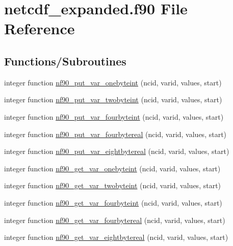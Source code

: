 \hypertarget{netcdf__expanded_8f90}{}\section{netcdf\+\_\+expanded.\+f90 File Reference}
\label{netcdf__expanded_8f90}
\subsection*{Functions/\+Subroutines}
\begin{DoxyCompactItemize}
\item 
integer function \hyperlink{netcdf__expanded_8f90_a0d03b7b88dcd719c503027ccebdd3920}{nf90\+\_\+put\+\_\+var\+\_\+onebyteint} (ncid, varid, values, start)
\item 
integer function \hyperlink{netcdf__expanded_8f90_acff6575674141c88292d791bb798dbb8}{nf90\+\_\+put\+\_\+var\+\_\+twobyteint} (ncid, varid, values, start)
\item 
integer function \hyperlink{netcdf__expanded_8f90_a1a5eac8109e488b5e0d5a18931978861}{nf90\+\_\+put\+\_\+var\+\_\+fourbyteint} (ncid, varid, values, start)
\item 
integer function \hyperlink{netcdf__expanded_8f90_a6acbd7d06b475d2a9cf6dae39ee1ef74}{nf90\+\_\+put\+\_\+var\+\_\+fourbytereal} (ncid, varid, values, start)
\item 
integer function \hyperlink{netcdf__expanded_8f90_a8e8d2b7b9de3bc80891a9d4092be7813}{nf90\+\_\+put\+\_\+var\+\_\+eightbytereal} (ncid, varid, values, start)
\item 
integer function \hyperlink{netcdf__expanded_8f90_ab84f26faf47ece5b6f01e87952a3e366}{nf90\+\_\+get\+\_\+var\+\_\+onebyteint} (ncid, varid, values, start)
\item 
integer function \hyperlink{netcdf__expanded_8f90_a69641a19fcce3c8bf20336b42d01826d}{nf90\+\_\+get\+\_\+var\+\_\+twobyteint} (ncid, varid, values, start)
\item 
integer function \hyperlink{netcdf__expanded_8f90_aa5d3ca05a9381711a859ab4712dc7b2d}{nf90\+\_\+get\+\_\+var\+\_\+fourbyteint} (ncid, varid, values, start)
\item 
integer function \hyperlink{netcdf__expanded_8f90_a0fb4405d7b5e49f2333a0c45151d59aa}{nf90\+\_\+get\+\_\+var\+\_\+fourbytereal} (ncid, varid, values, start)
\item 
integer function \hyperlink{netcdf__expanded_8f90_ac83fc3cd89b07643fe7a144cace5811b}{nf90\+\_\+get\+\_\+var\+\_\+eightbytereal} (ncid, varid, values, start)

\end{DoxyCompactItemize}
